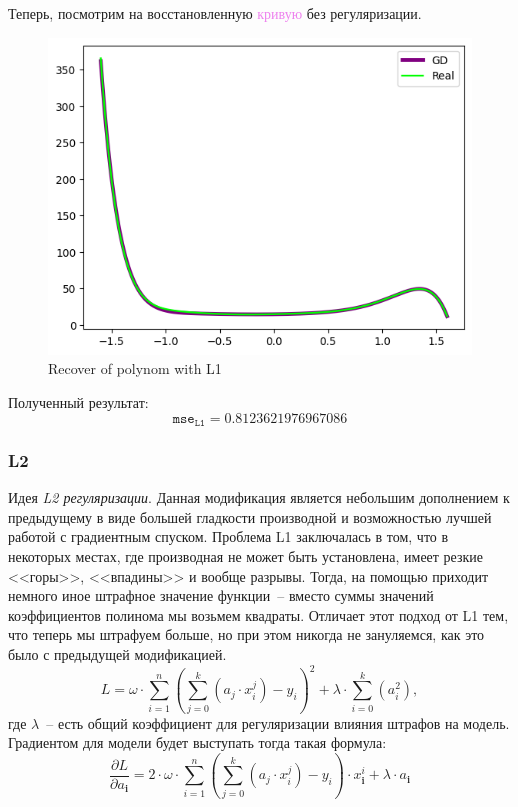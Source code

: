 \documentclass[12pt, a4paper, oneside, final]{article}
\begin{document}
	Теперь, посмотрим на восстановленную \textcolor{violet}{кривую} без регуляризации.
	\begin{figure}[H]
		\centering
		\includegraphics[scale = 1]{Image/AT2_L1_V2_RECOVER.png}
		\caption*{Recover of polynom with L1}
	\end{figure}
	Полученный результат:
	\[
		\mathtt{mse}_{\mathtt{L1}} = 0.8123621976967086
	\]
	\subsubsection*{L2}
	Идея \textit{L2 регуляризации}.
	Данная модификация является небольшим дополнением к предыдущему в виде большей гладкости производной и возможностью лучшей работой с градиентным спуском.
	Проблема L1 заключалась в том, что в некоторых местах, где производная не может быть установлена, имеет резкие <<горы>>, <<впадины>> и вообще разрывы.
	Тогда, на помощью приходит немного иное штрафное значение функции~-- вместо суммы значений коэффициентов полинома мы возьмем квадраты.
	Отличает этот подход от L1 тем, что теперь мы штрафуем больше, но при этом никогда не зануляемся, как это было с предыдущей модификацией.
	\[
		L = \omega\cdot\sum\limits_{i = 1}^{n}{\left(\sum\limits_{j = 0}^{k}{\left(a_{j} \cdot x^{j}_{i}\right)} - y_{i}\right)^{2}} + \lambda \cdot \sum\limits_{i = 0}^{k}{\left(a_{i}^2\right)},
	\]
	где $\lambda$~-- есть общий коэффициент для регуляризации влияния штрафов на модель.
	Градиентом для модели будет выступать тогда такая формула:
	\[
		\dfrac{\partial{L}}{\partial{a_{\mathbf{i}}}} = 2\cdot\omega\cdot\sum\limits_{i = 1}^{n}{\left(\sum\limits_{j = 0}^{k}{\left(a_{j} \cdot x_{i}^{j}\right)} - y_{i}\right) \cdot x^{i}_{\mathbf{i}}} + \lambda \cdot a_{\mathbf{i}}
	\]
\end{document}
